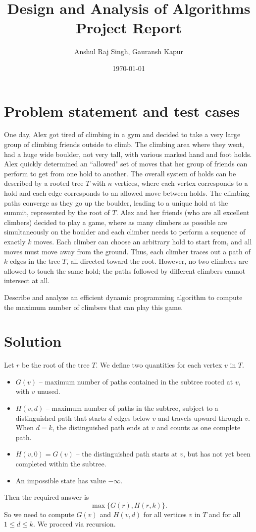 \documentclass[11pt]{scrartcl}
\theoremstyle{plain}
\theoremstyle{definition}
\theoremstyle{remark}
\begin{document}
\title{Design and Analysis of Algorithms Project Report}
\author{Anshul Raj Singh, Gauransh Kapur}
\date{\today}
\maketitle

\tableofcontents

\section{Problem statement and test cases}
One day, Alex got tired of climbing in a gym and decided to take a very large group of climbing friends outside to climb. The climbing area where they went, had a huge wide boulder, not very tall, with various marked hand and foot holds. Alex quickly determined an ``allowed" set of moves that her group of friends can perform to get from one hold to another. The overall system of holds can be described by a rooted tree
$T$ with $n$ vertices, where each vertex corresponds to a hold and each edge corresponds to an allowed move between holds. The climbing paths converge as they go up the boulder, leading to a unique hold at the summit, represented by the root of $T$. Alex and her friends (who are all excellent climbers) decided to play a game, where as many climbers
as possible are simultaneously on the boulder and each climber needs to perform a sequence of exactly $k$ moves. Each climber can choose an arbitrary hold to start from, and all moves must move away from the ground. Thus, each climber traces out a path of $k$ edges in the tree $T$, all directed toward the root. However, no two climbers are allowed to
touch the same hold; the paths followed by different climbers cannot intersect at all. 

Describe and analyze an efficient dynamic programming algorithm to compute the maximum number of climbers that can play this game.

\section{Solution}
Let $r$ be the root of the tree $T$. We define two quantities for each vertex $v$ in $T$.\\
\begin{itemize}
    \item $G(v)$ -- maximum number of paths contained in the subtree rooted at \(v\), with \(v\) unused.
    \item $H(v,d)$ -- maximum number of paths in the subtree, subject to a distinguished path that starts \(d\) edges below \(v\) and travels upward through \(v\). When \(d=k\), the distinguished path ends at \(v\) and counts as one complete path.
    \item $H(v,0)=G(v)$ -- the distinguished path starts at $v$, but has not yet been completed within the subtree.
    \item An impossible state has value $-\infty$.
\end{itemize}Then the required answer is \[\max\{G(r), H(r, k)\}.\]
So we need to compute $G(v)$ and $H(v, d)$ for all vertices $v$ in $T$ and for all $1\leq d\leq k$. We proceed via recursion.\\
\end{document}
